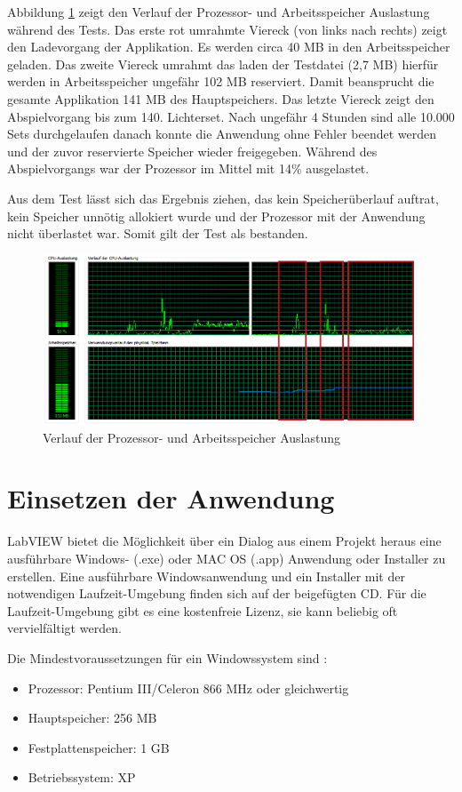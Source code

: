 Abbildung \ref{fig:test} zeigt den Verlauf der Prozessor- und Arbeitsspeicher Auslastung während des Tests. Das erste rot umrahmte Viereck (von links nach rechts) zeigt den Ladevorgang der Applikation. Es werden circa 40 MB in den Arbeitsspeicher geladen. Das zweite Viereck umrahmt das laden der Testdatei (2,7 MB) hierfür werden in Arbeitsspeicher ungefähr 102 MB reserviert. Damit beansprucht die gesamte Applikation 141 MB des Hauptspeichers. Das letzte Viereck zeigt  den Abspielvorgang bis zum 140. Lichterset. Nach ungefähr 4 Stunden sind alle 10.000 Sets durchgelaufen danach konnte die Anwendung ohne Fehler beendet werden und der zuvor reservierte Speicher wieder freigegeben. Während des Abspielvorgangs war der Prozessor im Mittel mit 14\% ausgelastet.

Aus dem Test lässt sich das Ergebnis ziehen, das kein Speicherüberlauf auftrat, kein Speicher unnötig allokiert wurde und der Prozessor mit der Anwendung nicht überlastet war. Somit gilt der Test als bestanden. 

	\begin{figure}%
	\centering
		\includegraphics[width=\textwidth]{Pics/test04.png}
	\caption{Verlauf der Prozessor- und Arbeitsspeicher Auslastung}
	\label{fig:test}
	\end{figure}


\section{Einsetzen der Anwendung}
LabVIEW bietet die Möglichkeit über ein Dialog aus einem Projekt heraus eine ausführbare Windows- (.exe) oder MAC OS (.app) Anwendung oder Installer zu erstellen. 
Eine ausführbare Windowsanwendung und ein Installer mit der notwendigen Laufzeit-Umgebung finden sich auf der beigefügten CD. Für die Laufzeit-Umgebung gibt es eine kostenfreie Lizenz, sie kann beliebig oft vervielfältigt werden.

Die Mindestvoraussetzungen für ein Windowssystem sind \cite{ni-min}: 
\begin{itemize}
\item Prozessor: Pentium III/Celeron 866 MHz oder gleichwertig
\item Hauptspeicher: 256 MB
\item Festplattenspeicher: 1 GB
\item Betriebssystem: XP
\end{itemize}

